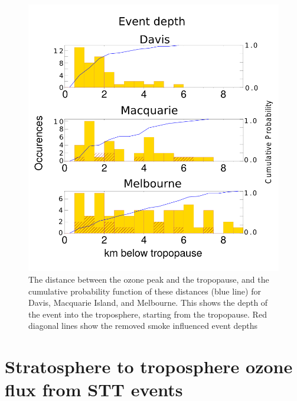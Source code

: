 \documentclass{article}
\begin{document}
  \begin{figure}[!htbp]
    \begin{center}
    \includegraphics[width=1.0\columnwidth]{figures/TPDistance.png}
    \caption{The distance between the ozone peak and the tropopause, and the cumulative probability function of these distances (blue line) for Davis, Macquarie Island, and Melbourne.
    This shows the depth of the event into the troposphere, starting from the tropopause.
    Red diagonal lines show the removed smoke influenced event depths}
    \label{fig:SummaryTPDepths}
    \end{center}
  \end{figure}

\section{Stratosphere to troposphere ozone flux from STT events}
  
\end{document}
